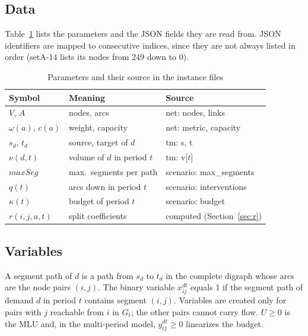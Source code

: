 \documentclass[conference]{IEEEtran}
\begin{document}
\subsection{Data}
Table~\ref{tab:data} lists the parameters and the JSON fields they are read from. JSON identifiers are mapped to consecutive indices, since they are not always listed in order (setA-14 lists its nodes from 249 down to 0).

\begin{table}[t]
\centering\footnotesize
\caption{Parameters and their source in the instance files}\label{tab:data}
\begin{tabular}{@{}lll@{}}
\toprule
Symbol & Meaning & Source\\
\midrule
$V$, $A$ & nodes, arcs & net: nodes, links\\
$\omega(a)$, $c(a)$ & weight, capacity & net: metric, capacity\\
$s_d$, $t_d$ & source, target of $d$ & tm: s, t\\
$\nu(d,t)$ & volume of $d$ in period $t$ & tm: v[$t$]\\
$maxSeg$ & max.\ segments per path & scenario: max\_segments\\
$q(t)$ & arcs down in period $t$ & scenario: interventions\\
$\kappa(t)$ & budget of period $t$ & scenario: budget\\
$r(i,j,a,t)$ & split coefficients & computed (Section~\ref{sec:r})\\
\bottomrule
\end{tabular}
\end{table}

\subsection{Variables}
A segment path of $d$ is a path from $s_d$ to $t_d$ in the complete digraph whose arcs are the node pairs $(i,j)$. The binary variable $x^{dt}_{ij}$ equals 1 if the segment path of demand $d$ in period $t$ contains segment $(i,j)$. Variables are created only for pairs with $j$ reachable from $i$ in $G_t$; the other pairs cannot carry flow. $U\ge0$ is the MLU and, in the multi-period model, $y^{dt}_{ij}\ge0$ linearizes the budget.
\end{document}
